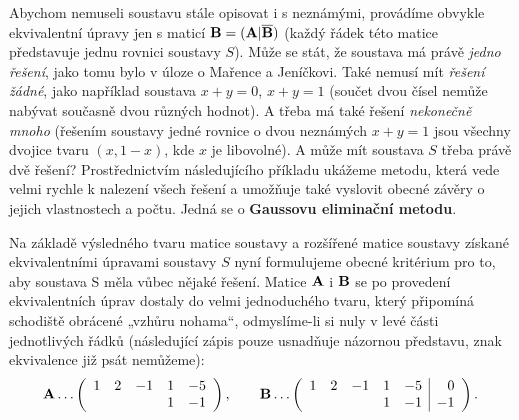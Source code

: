     Abychom nemuseli soustavu stále opisovat i s neznámými, provádíme obvykle ekvivalentní 
    úpravy jen s maticí \(\mathbf{B} = (\mathbf{A}|\overline{\mathbf{B}})\) (každý řádek této matice 
    představuje jednu rovnici soustavy \(S\)). Může se stát, že soustava má právě \emph{jedno 
    řešení}, jako tomu bylo v  úloze o Mařence a Jeníčkovi. Také nemusí mít \emph{řešení žádné}, 
    jako například soustava \(x + y = 0\), \(x + y = 1\) (součet dvou čísel nemůže nabývat současně 
    dvou různých hodnot). A třeba má také řešení \emph{nekonečně mnoho} (řešením soustavy jedné 
    rovnice o dvou neznámých \(x + y = 1\) jsou všechny dvojice tvaru \((x, 1 - x)\), kde \(x\) je 
    libovolné). A může mít soustava \(S\) třeba právě dvě řešení? Prostřednictvím následujícího 
    příkladu ukážeme metodu, která vede velmi rychle k nalezení všech řešení a umožňuje také 
    vyslovit obecné závěry o jejich vlastnostech a počtu. Jedná se o \textbf{Gaussovu eliminační 
    metodu}.

    

    Na základě výsledného tvaru matice soustavy a rozšířené matice soustavy získané ekvivalentními 
    úpravami soustavy \(S\) nyní formulujeme obecné kritérium pro to, aby soustava S měla
    vůbec nějaké řešení. Matice \(\mathbf{A}\) i \(\mathbf{B}\) se po provedení ekvivalentních úprav 
    dostaly do velmi jednoduchého tvaru, který připomíná schodiště obrácené „vzhůru nohama“, 
    odmyslíme-li si nuly v levé části jednotlivých řádků (následující zápis pouze usnadňuje 
    názornou představu, znak ekvivalence již psát nemůžeme):
    \begin{equation*}
      \mathbf{A} \ldots
      \left(
        \begin{array}{rrrrr}
                1 &  2 & -1 & 1      & -5     \\
                  &    &    & 1      & -1     \\
 
        \end{array}
      \right),
      \qquad
      \mathbf{B} \ldots
      \left(
        \begin{array}{rrrrr|r}
                1 &  2 & -1 & 1      & -5 &  0    \\
                  &    &    & 1      & -1 & -1    \\
        \end{array}
      \right).
    \end{equation*}
    
